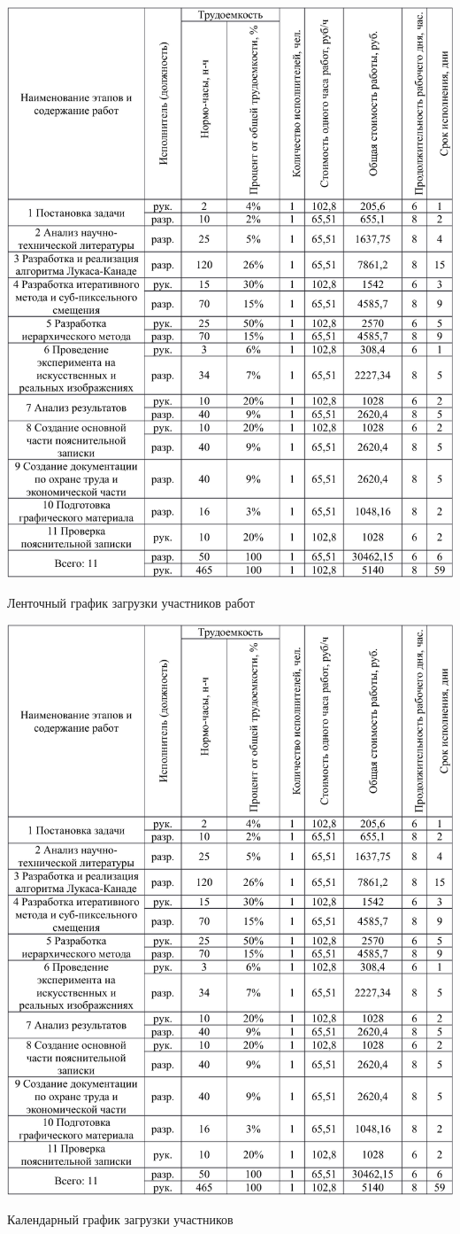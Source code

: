 \begin{table}[h!]
\centering
\includegraphics[page=2, width=0.9\linewidth]{econom_table.pdf}
\caption{Ленточный график загрузки участников работ}
\label{tab:eco_2}
\end{table}

\begin{table}[h!]
\centering
\includegraphics[page=3, width=0.9\linewidth]{econom_table.pdf}
\caption{Календарный график загрузки участников}
\label{tab:eco_3}
\end{table}

